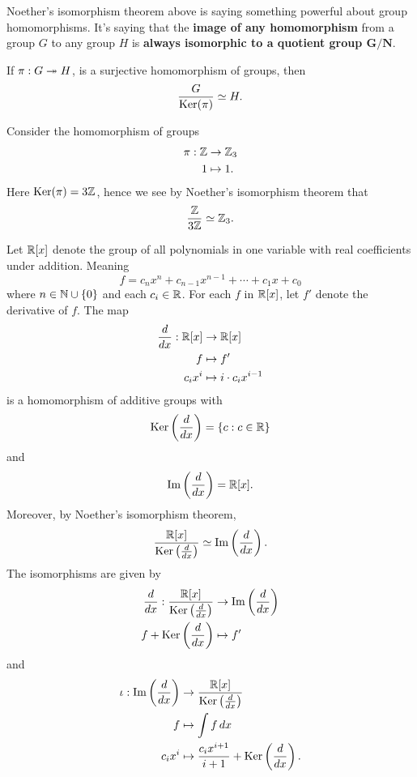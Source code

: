 \documentclass{ximera}
\begin{document}
Noether's isomorphism theorem above is saying something powerful about
group homomorphisms. It's saying that the \textbf{image of any
  homomorphism} from a group $G$ to any group $H$ is \textbf{always
  isomorphic to a quotient group $\boldsymbol{G/N}$}.


\begin{corollary}
  If $\pi:G\twoheadrightarrow H$, is a surjective homomorphism of groups, then
  \[
  \frac{G}{\mathop{\mathrm{Ker}}\nolimits(\pi)} \simeq H.
  \]
\end{corollary}

\begin{example}
  Consider the homomorphism of groups
  \begin{align*}
    \pi:\mathbb Z &\to \mathbb Z_3\\
    1 &\mapsto 1.
  \end{align*}
  Here $\mathop{\mathrm{Ker}}\nolimits(\pi)= 3\mathbb Z$, hence we see by Noether's isomorphism
  theorem that
  \[
  \frac{\mathbb Z}{3\mathbb Z}\simeq \mathbb Z_3.
  \]
\end{example}



\begin{example}
  Let $\mathbb R[x]$ denote the group of all polynomials in one variable with
  real coefficients under addition. Meaning
  \[
  f = c_nx^{n} + c_{n-1}x^{n-1} + \cdots + c_1x + c_0
  \]
  where $n\in\mathbb N\cup\{0\}$ and each $c_i\in\mathbb R$.  For each $f$ in
  $\mathbb R[x]$, let $f'$ denote the derivative of $f$. The map
  \begin{align*}
    \frac{d}{dx}:\mathbb R[x]&\to\mathbb R[x]\\
    f  &\mapsto f'\\
    c_i x^i &\mapsto i\cdot c_i x^{i-1}
  \end{align*}
  is a homomorphism of additive groups with
  \[
  \mathop{\mathrm{Ker}}\nolimits\left(\frac{d}{dx}\right) = \{c:c\in \mathbb R\}
  \]
  and
  \[
  \operatorname{Im}\left(\frac{d}{dx}\right) =\mathbb R[x].
  \]
  Moreover, by Noether's isomorphism theorem,
  \[
  \frac{\mathbb R[x]}{\mathop{\mathrm{Ker}}\nolimits\left(\frac{d}{dx}\right)} \simeq \operatorname{Im}\left(\frac{d}{dx}\right).
  \]
  The isomorphisms are given by
  \begin{align*}
    \frac{d}{dx}:\frac{\mathbb R[x]}{\mathop{\mathrm{Ker}}\nolimits\left(\frac{d}{dx}\right)} &\to \operatorname{Im}\left(\frac{d}{dx}\right)\\
    f+\mathop{\mathrm{Ker}}\nolimits\left(\frac{d}{dx}\right) &\mapsto f'
  \end{align*}
  and
  \begin{align*}
    \iota:   \operatorname{Im}\left(\frac{d}{dx}\right) &\to \frac{\mathbb R[x]}{\mathop{\mathrm{Ker}}\nolimits\left(\frac{d}{dx}\right)} \\
    f &\mapsto \int f \, d x\\
    c_ix^i &\mapsto \frac{c_ix^{i+1}}{i+1} + \mathop{\mathrm{Ker}}\nolimits\left(\frac{d}{dx}\right).
  \end{align*}
\end{example}
\end{document}
